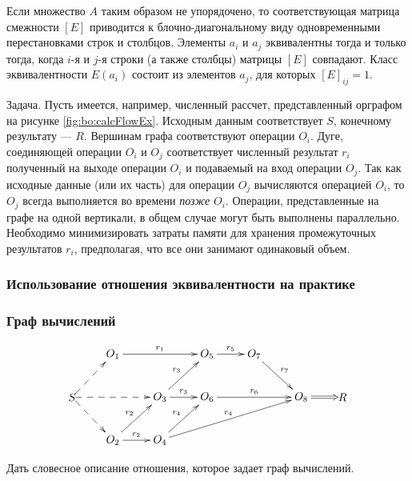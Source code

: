 Если множество $A$ таким образом не упорядочено, то соответствующая матрица смежности $[E]$ приводится к блочно-диагональному виду одновременными перестановками строк и столбцов. Элементы $a_i$ и $a_j$ эквивалентны тогда и только тогда, когда $i$-я и $j$-я строки (а также столбцы) матрицы $[E]$ совпадают. Класс эквивалентности $E(a_i)$ состоит из элементов $a_j$, для которых $[E]_{ij}=1$.

\begin{example}
    Задача. Пусть имеется, например, численный рассчет, представленный орграфом на рисунке \ref{fig:bo:calcFlowEx}. Исходным данным соответствует $S$, конечному результату --- $R$. Вершинам графа соответствуют операции $O_i$. Дуге, соединяющей операции $O_i$ и $O_j$ соответствует численный результат $r_i$ полученный на выходе операции $O_i$ и подаваемый на вход операции $O_j$. Так как исходные данные (или их часть) для операции $O_j$ вычисляются операцией $O_i$, то $O_j$ всегда выполняется во времени \emph{позже} $O_i$. Операции, представленные на графе на одной вертикали, в общем случае могут быть выполнены параллельно. Необходимо минимизировать затраты памяти для хранения промежуточных результатов $r_i$, предполагая, что все они занимают одинаковый объем.
\end{example}

\begin{frame}
    \frametitle{Использование отношения эквивалентности на практике}
    \frametitle{Граф вычислений}
    
    \[
        {\xymatrix{
            *{}
                &O_1\ar@{->}[rr]^{r_1}
                    &*{}
                        &O_5 \ar@{->}[r]^{r_5}
                            &O_7 \ar@{->}[dr]^{r_7}
                                &*{}
                                    &*{}
                    \\
            *{S} \ar@{-->}[ur] \ar@{-->}[dr] \ar@{-->}[rr]
                &*{}
                    &O_3 \ar@{->}[r]^{r_3} \ar@{->}[ur]^{r_3}
                        &O_6 \ar@{->}[rr]^{r_6}
                            &*{}
                                &O_8 \ar@{=>}[r]
                                    &*{R}
                    \\
            *{}
                &O_2 \ar@{->}[r]^{r_2} \ar@{->}[ur]^{r_2}
                    &O_4 \ar@{->}[ur]^{r_4} \ar@{->}[urrr]^{r_4}
                        &*{}
                            &*{}
                                &*{}
                                    &*{}
                    \\
        }}
    \]
    
    Дать словесное описание отношения, которое задает граф вычислений.
\end{frame}

